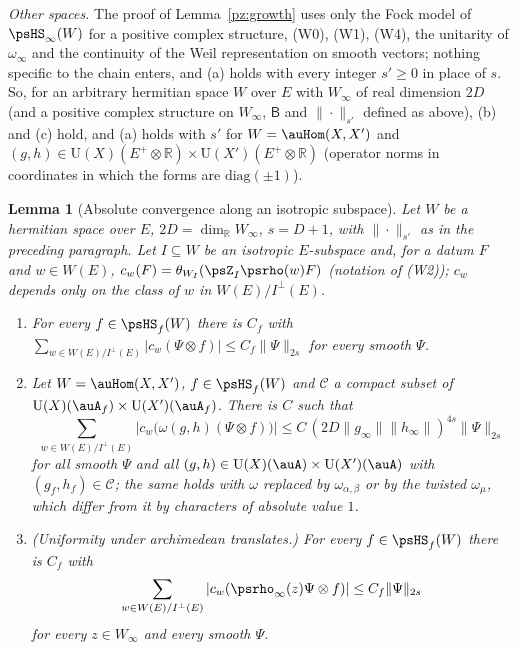 \documentclass[10pt]{amsart}
\newtheorem{lemma}[theorem]{Lemma}
\theoremstyle{definition}
\theoremstyle{remark}
\newcommand{\R}{\mathbb R}
\providecommand{\auU}{\mathrm U}
\begin{document}
\emph{Other spaces.} The proof of Lemma~\ref{pz:growth} uses only the Fock model of
$\psHS_\infty(W)$ for a positive complex structure, (W0), (W1), (W4), the unitarity of $\omega_\infty$
and the continuity of the Weil representation on smooth vectors; nothing specific to the chain
enters, and (a) holds with every integer $s'\ge0$ in place of $s$. So, for an arbitrary hermitian
space $W$ over $E$ with $W_\infty$ of real dimension $2D$ (and a positive complex structure on
$W_\infty$, $\mathsf B$ and $\|\cdot\|_{s'}$ defined as above), (b) and (c) hold, and (a) holds with
$s'$ for $W=\auHom(X,X')$ and $(g,h)\in\auU(X)(E^+\otimes\R)\times\auU(X')(E^+\otimes\R)$ (operator norms
in coordinates in which the forms are $\mathrm{diag}(\pm1)$).

\begin{lemma}[Absolute convergence along an isotropic subspace]\label{pz:absgrowth}
Let $W$ be a hermitian space over $E$, $2D=\dim_\R W_\infty$, $s=D+1$, with $\|\cdot\|_{s'}$ as in the
preceding paragraph. Let $I\subseteq W$ be an isotropic $E$-subspace and, for a datum $F$ and $w\in
W(E)$, $c_w(F)=\theta_{W_I}(\psZ_I\psrho(w)F)$ \textup{(}notation of \textup{(W2))}; $c_w$ depends only on
the class of $w$ in $W(E)/I^\perp(E)$.
\begin{enumerate}
\item[\textup{(a)}] For every $f\in\psHS_f(W)$ there is $C_f$ with $\sum_{w\in W(E)/I^\perp(E)}|c_w(\Psi\otimes
f)|\le C_f\|\Psi\|_{2s}$ for every smooth $\Psi$.
\item[\textup{(b)}] Let $W=\auHom(X,X')$, $f\in\psHS_f(W)$ and $\mathcal C$ a compact subset of
$\auU(X)(\auA_f)\times\auU(X')(\auA_f)$. There is $C$ such that
\[
\sum_{w\in W(E)/I^\perp(E)}\bigl|c_w\bigl(\omega(g,h)(\Psi\otimes f)\bigr)\bigr|\le C\,(2D\|g_\infty\|\|h_\infty\|)^{4s}
\|\Psi\|_{2s}
\]
for all smooth $\Psi$ and all $(g,h)\in\auU(X)(\auA)\times\auU(X')(\auA)$ with $(g_f,h_f)\in\mathcal C$;
the same holds with $\omega$ replaced by $\omega_{\alpha,\beta}$ or by the twisted $\omega_\mu$, which differ
from it by characters of absolute value $1$.
\item[\textup{(c)}] \textup{(Uniformity under archimedean translates.)} For every $f\in\psHS_f(W)$ there is
$C_f$ with
\[
\sum_{w\in W(E)/I^\perp(E)}|c_w(\psrho_\infty(z)\Psi\otimes f)|\le C_f\|\Psi\|_{2s}
\]
for every
$z\in W_\infty$ and every smooth $\Psi$.
\end{enumerate}
\end{lemma}
\end{document}
